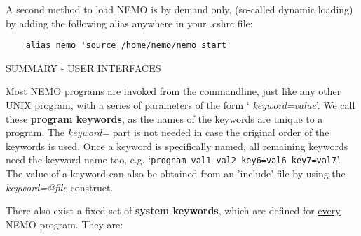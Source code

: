 A second method to load NEMO is by demand only, (so-called dynamic loading)
by adding the following alias anywhere in your .cshrc file:
\begin{verbatim}
 	alias nemo 'source /home/nemo/nemo_start'
\end{verbatim}

\newpage
\centerline{SUMMARY - USER INTERFACES}

Most NEMO programs are invoked from the commandline, just like any other
UNIX program, with a series of parameters of the form `{\it
keyword=value}'.  We call these {\bf program keywords}, as the names of
the keywords are unique to a program.  The {\it keyword=} part is not
needed in case the original order of the keywords is used.  Once a
keyword is specifically named, all remaining keywords need the keyword
name too, e.g.  `{\tt prognam val1 val2 key6=val6 key7=val7}'.  The
value of a keyword can also be obtained from an 'include' file by using
the {\it keyword=@file} construct. 

There also exist a fixed set of {\bf system keywords}, which are defined
for \underline{every} NEMO program. They are:

